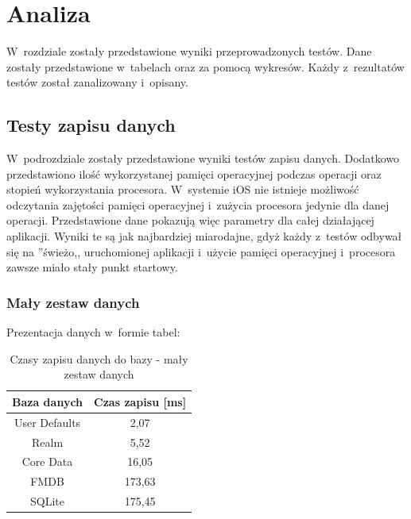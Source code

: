 \section{Analiza}

 W~rozdziale zostały przedstawione wyniki przeprowadzonych testów. Dane zostały przedstawione w~tabelach oraz za pomocą wykresów. Każdy z~rezultatów testów został zanalizowany i~opisany.

\subsection{Testy zapisu danych}
 W~podrozdziale zostały przedstawione wyniki testów zapisu danych. Dodatkowo przedstawiono ilość wykorzystanej pamięci operacyjnej podczas operacji oraz stopień wykorzystania procesora. W~systemie iOS nie istnieje możliwość odczytania zajętości pamięci operacyjnej i~zużycia procesora jedynie dla danej operacji. Przedstawione dane pokazują więc parametry dla całej działającej aplikacji. Wyniki te są jak najbardziej miarodajne, gdyż każdy z~testów odbywał się na ''świeżo,, uruchomionej aplikacji i~użycie pamięci operacyjnej i~procesora zawsze miało stały punkt startowy. 

\subsubsection{Mały zestaw danych}

Prezentacja danych w~formie tabel: 

\begin{table}[h]
\centering
\caption{Czasy zapisu danych do bazy - mały zestaw danych}
\label{tab: small-save-time-table}
\begin{tabular}{|c|c|}
\hline
Baza danych   & Czas zapisu [ms] \\ \hline
User Defaults & 2,07             \\ \hline
Realm         & 5,52             \\ \hline
Core Data     & 16,05            \\ \hline
FMDB          & 173,63           \\ \hline
SQLite        & 175,45           \\ \hline
\end{tabular}
\end{table}

